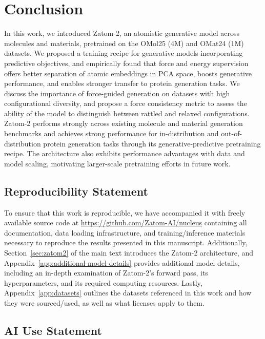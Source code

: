 \documentclass{article} %
\begin{document}
\section{Conclusion}

In this work, we introduced Zatom-2, an atomistic generative model across molecules and materials, pretrained on the OMol25 (4M) and OMat24 (1M) datasets. We proposed a training recipe for generative models incorporating predictive objectives, and empirically found that force and energy supervision offers better separation of atomic embeddings in PCA space, boosts generative performance, and enables stronger transfer to protein generation tasks. We discuss the importance of force-guided generation on datasets with high configurational diversity, and propose a force consistency metric to assess the ability of the model to distinguish between rattled and relaxed configurations. Zatom-2 performs strongly across existing molecule and material generation benchmarks and achieves strong performance for in-distribution and out-of-distribution protein generation tasks through its generative-predictive pretraining recipe. The architecture also exhibits performance advantages with data and model scaling, motivating larger-scale pretraining efforts in future work.


\subsection*{Reproducibility Statement}

To ensure that this work is reproducible, we have accompanied it with freely available source code at \url{https://github.com/Zatom-AI/nucleus} containing all documentation, data loading infrastructure, and training/inference materials necessary to reproduce the results presented in this manuscript. Additionally, Section~\ref{sec:zatom2} of the main text introduces the Zatom-2 architecture, and Appendix~\ref{app:additional-model-details} provides additional model details, including an in-depth examination of Zatom-2's forward pass, its hyperparameters, and its required computing resources. Lastly, Appendix~\ref{app:datasets} outlines the datasets referenced in this work and how they were sourced/used, as well as what licenses apply to them.

\subsection*{AI Use Statement}
\end{document}
